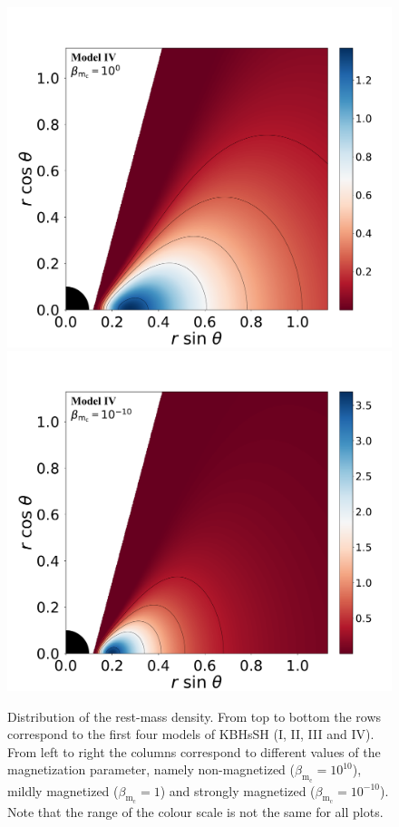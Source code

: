 \documentclass[twocolumn,aps,showpacs,showkeys,prd,superscriptaddress,byrevtex, amsmath]{revtex4-1}
\begin{document}
\begin{figure}
\includegraphics[scale=0.14]{figures/fig1_IV_1.pdf}
\hspace{-0.2cm}
\includegraphics[scale=0.14]{figures/fig1_IV__10.pdf}
\hspace{-0.2cm}
\caption{Distribution of the rest-mass density. From top to bottom the rows correspond to the first four models of KBHsSH (I, II, III and IV). From left to right the columns correspond to different values of the magnetization parameter, namely non-magnetized ($\beta_{\mathrm{m}_{\mathrm{c}}} = 10^{10}$), mildly magnetized ($\beta_{\mathrm{m}_{\mathrm{c}}} = 1$) and strongly magnetized ($\beta_{\mathrm{m}_{\mathrm{c}}} = 10^{-10}$). Note that the range of the colour scale is not the same for all plots.}
\label{models_I}
\end{figure}
\end{document}
